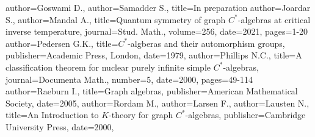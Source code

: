 \documentclass[a4paper,11pt,reqno]{amsart}
\theoremstyle{plain}
\theoremstyle{named}
\numberwithin{equation}{section}
\begin{document}
                        \begin{bibdiv}
   \begin{biblist}
   {author={Goswami D.},
   author={Samadder S.},
   title={In preparation}
   }
   {
   author={Joardar S.},
   author={Mandal A.},
   title={Quantum symmetry of graph $C^{\ast}$-algebras at critical inverse temperature}, 
   journal={Stud. Math.}, 
   volume={256},
   date={2021}, 
   pages={1-20}
   }
   {
   author={Pedersen G.K.},
   title={$C^{\ast}$-algberas and their automorphism groups}, 
   publisher={Academic Press, London}, 
   date={1979}, 
   }
   {
   author={Phillips N.C.},
   title={A classification theorem for nuclear purely infinite simple $C^{\ast}$-algebras}, 
   journal={Documenta Math.}, 
   number={5},
   date={2000}, 
   pages={49-114}
   }
   {
   author={Raeburn I.},
   title={Graph algebras}, 
   publisher={American Mathematical Society}, 
   date={2005}, 
   }
   {
   author={Rordam M.},
   author={Larsen F.},
   author={Lausten N.},
   title={An Introduction to $K$-theory for graph $C^{\ast}$-algebras}, 
   publisher={Cambridge University Press}, 
   date={2000}, 
   }
   \end{biblist}
   \end{bibdiv}
            
\end{document}
